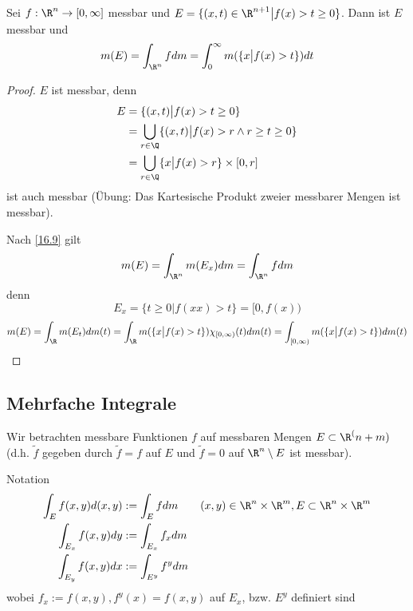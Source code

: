 \documentclass[a4paper,10pt]{scrartcl}
\begin{document}
\begin{st}
	\label{16.11}
	Sei $f:\R^n\to [0,\infty]$ messbar und $E = \{(x,t)\in \R^{n+1} \big| f(x) > t \ge 0\}$.
	Dann ist $E$ messbar und
	\[
		m(E) = \int_{\R^n} f dm = \int_0^\infty m(\{x\big| f(x) > t\})dt
	\]
	\begin{proof}
		$E$ ist messbar, denn
		\begin{align*}
			E &= \{(x,t) \big| f(x) > t\ge 0\}\\
		   	&= \bigcup_{r\in \Q}\{(x,t)\big| f(x) > r\land r\ge t\ge 0\} \\
			&=\bigcup_{r\in \Q}\{x\big| f(x) > r\} \times [0,r]\\
		\end{align*}
		ist auch messbar (Übung: Das Kartesische Produkt zweier messbarer Mengen ist messbar).

		Nach \ref{16.9} gilt
		\[
			m(E) = \int_{\R^n}m(E_x) dm = \int_{\R^n}f dm
		\]
		denn
		\[
			E_x = \{t\ge 0\big| f(xx) > t\} = [0,f(x))
		\]
		\[
			m(E) = \int_\R m(E_t)dm(t) = \int_{\R}m(\{x\big|f(x)>t\})\chi_{[0,\infty)}(t) dm(t)
			= \int_{[0,\infty)} m(\{x\big|f(x)>t\})dm(t)
		\]
	\end{proof}
\end{st}


\subsection{Mehrfache Integrale}


Wir betrachten messbare Funktionen $f$ auf messbaren Mengen $E\subset \R^(n+m)$ (d.h. $\tilde f$ gegeben durch $\tilde f=f$ auf $E$ und $\tilde f=0$ auf $\R^n\setminus E$ ist messbar).

\begin{seg}{Notation}
	\begin{align*}
		\int_E f(x,y) d(x,y) &:= \int_E fdm \qquad (x,y)\in \R^n\times \R^m, E\subset \R^n\times \R^m\\
		\int_{E_x}f(x,y) dy &:= \int_{E_x}f_x dm\\
		\int_{E_y}f(x,y) dx &:= \int_{E^y}f^y dm
	\end{align*}
	wobei $f_x := f(x,y), f^y(x) = f(x,y)$ auf $E_x$, bzw. $E^y$ definiert sind
\end{seg}
\end{document}
